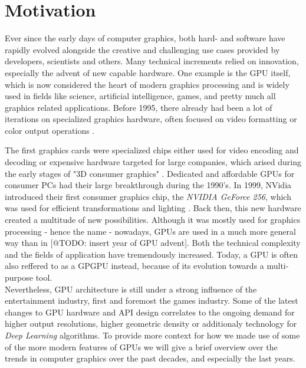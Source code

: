 \chapter{Motivation} \label{cpt-motivation}


Ever since the early days of computer graphics, both hard- and software have rapidly evolved
alongside the creative and challenging use cases provided by developers, scientists and others.
Many technical increments relied on innovation, especially the advent of new capable hardware.
One example is the \ac{GPU} itself, which is now considered the heart of modern graphics 
processing and is widely used in fields like science, artificial intelligence, games, and pretty 
much all graphics related applications. Before 1995, there already had been a lot of iterations 
on specialized graphics hardware, often focused on video formatting or color output operations
\cite{Singer2023}.

The first graphics cards were specialized chips either used for video encoding and decoding
or expensive hardware targeted for large companies, which arised during the early stages 
of "3D consumer graphics" \cite{Singer2023}. Dedicated and affordable \ac{GPU}s for consumer 
\ac{PC}s had their large breakthrough during the 1990's. In 1999, NVidia introduced their 
first consumer graphics chip, the \emph{NVIDIA GeForce 256}, which was used for efficient 
transformations and lighting \cite{Fenno2024}. Back then, this new hardware created a multitude 
of new possibilities. 
Although it was mostly used for graphics processing - hence the name - nowadays, \ac{GPU}s
are used in a much more general way than in [@TODO: insert year of GPU advent]. Both the 
technical complexity and the fields of application have tremendously increased. Today, a 
\ac{GPU} is often also reffered to as a \ac{GPGPU} instead, because of its evolution towards 
a multi-purpose tool. \\

\noindent
Nevertheless, \ac{GPU} architecture is still under a strong influence of the entertainment 
industry, first and foremost the games industry. Some of the latest changes to \ac{GPU} 
hardware and \ac{API} design correlates to the ongoing demand for higher output resolutions, 
higher geometric density or additionaly technology for \emph{Deep Learning} algorithms. 
To provide more context for how we made use of some of the more modern features of \ac{GPU}s 
we will give a brief overview over the trends in computer graphics over the past decades, and 
especially the last years.


